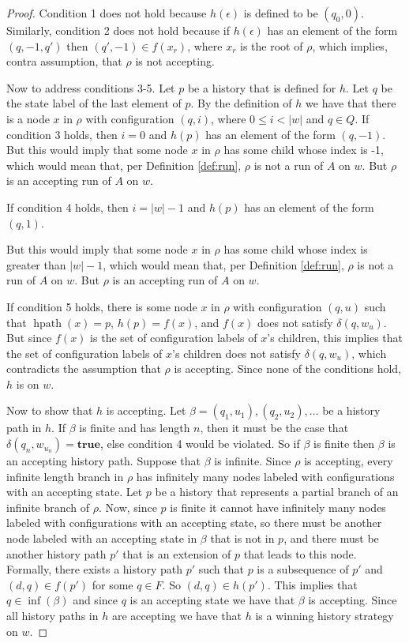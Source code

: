 \documentclass{lmcs}
\theoremstyle{definition}
\DeclareMathOperator{\?}{?}
\DeclareMathOperator{\mypath}{hpath}
\begin{document}
\begin{proof}
    Condition 1 does not hold because $h(\epsilon)$ is defined to be $(q_0,0)$. Similarly, condition 2 does not hold because
    if $h(\epsilon)$ has an element of the form $(q,-1,q')$ then $(q',-1) \in f(x_r)$, where $x_r$ is the root of $\rho$,
    which implies, contra assumption, that $\rho$ is not accepting.

    Now to address conditions 3-5. Let $p$ be a history that is defined for $h$. Let $q$ be the state label of the last element of $p$.
    By the definition of $h$ we have that there is a node $x$ in $\rho$ with configuration $(q,i)$, where $0 \leq i < |w|$ and $q \in Q$.
    If condition 3 holds, then $i = 0$ and $h(p)$ has an element of the form $(q,-1)$. But this would imply that some node $x$ in $\rho$
    has some child whose index is -1, which would mean that, per Definition \ref{def:run}, $\rho$ is not a run of $A$ on $w$. But $\rho$ is an accepting run of $A$ on $w$.

    If condition 4 holds, then $i = |w| - 1$ and $h(p)$
    has an element of the form $(q,1)$.

    But this would imply that some node $x$ in $\rho$ has some child whose index is greater than $|w| - 1$, which would mean that, per Definition \ref{def:run}, $\rho$ is not a run of $A$ on $w$. But $\rho$ is an accepting run of $A$ on $w$.

    If condition 5 holds, there is some node $x$ in $\rho$ with configuration
    $(q,u)$ such that
    $\mypath(x) = p$, $h(p) = f(x)$, and $f(x)$ does not satisfy $\delta(q,w_u)$. But since $f(x)$ is the set of configuration labels of
    $x$'s children, this implies that the set of configuration labels of $x$'s children does not satisfy $\delta(q,w_u)$, which
    contradicts the assumption that $\rho$ is accepting. Since none of the conditions hold, $h$ is on $w$.

    Now to show that $h$ is accepting. Let $\beta = (q_1,u_1),(q_2,u_2),\ldots$ be a history path in $h$. If $\beta$ is finite and has length $n$, then it
    must be the case that $\delta(q_n, w_{u_n}) = \textbf{true}$, else condition 4 would be violated. So if
    $\beta$ is finite then $\beta$ is an accepting history path. Suppose that $\beta$ is infinite.
    Since $\rho$ is accepting, every
    infinite length branch in $\rho$ has infinitely many nodes labeled with configurations with an accepting state.
    Let $p$ be a history that represents a partial branch of an infinite branch of $\rho$. Now, since $p$ is finite
    it cannot have infinitely many nodes labeled with configurations with an accepting state, so there must be
    another node labeled with an accepting state in $\beta$ that is not in $p$, and there must be another history path $p'$
    that is an extension of $p$ that leads to this node. Formally, there exists a history path $p'$ such that $p$ is a subsequence
    of $p'$ and $(d,q) \in f(p')$ for some $q \in F$. So $(d,q) \in h(p')$. This implies that $q \in \inf(\beta)$ and since
    $q$ is an accepting state we have that $\beta$ is accepting. Since all history paths in $h$ are accepting we have that $h$ is a winning history strategy on $w$.




\end{proof}
\end{document}
